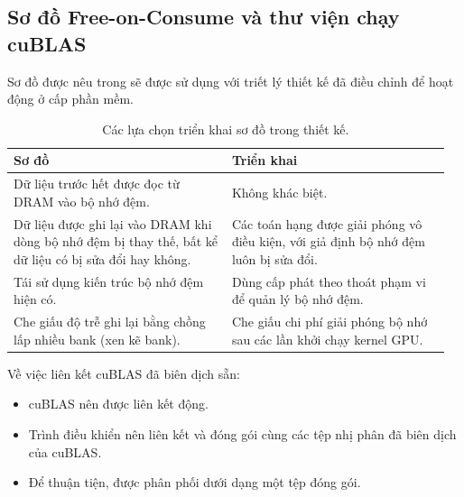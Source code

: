 \documentclass[a4paper]{article}
\begin{document}
	\subsection{Sơ đồ Free-on-Consume và thư viện chạy cuBLAS}
	Sơ đồ được nêu trong \cite{DybdahlKGN06} sẽ được sử dụng với triết lý thiết kế đã điều chỉnh để hoạt động ở cấp phần mềm.
	\begin{table}[htbp]
  \centering
  \caption{Các lựa chọn triển khai sơ đồ trong thiết kế.}
  \label{tab:scheme_implementation}
  \small
  \begin{tabular}{@{}>{\RaggedRight}p{0.48\linewidth} >{\RaggedRight}p{0.48\linewidth}@{}}
    \toprule
    \textbf{Sơ đồ} & \textbf{Triển khai} \\
    \midrule
    Dữ liệu trước hết được đọc từ DRAM vào bộ nhớ đệm. 
      & Không khác biệt. \\ \addlinespace
    
    Dữ liệu được ghi lại vào DRAM khi dòng bộ nhớ đệm bị thay thế, bất kể dữ liệu có bị sửa đổi hay không. 
      & Các toán hạng được giải phóng vô điều kiện, với giả định bộ nhớ đệm luôn bị sửa đổi. \\ \addlinespace
    
    Tái sử dụng kiến trúc bộ nhớ đệm hiện có. 
      & Dùng cấp phát theo thoát phạm vi để quản lý bộ nhớ đệm. \\ \addlinespace
    
    Che giấu độ trễ ghi lại bằng chồng lấp nhiều bank (xen kẽ bank). 
      & Che giấu chi phí giải phóng bộ nhớ sau các lần khởi chạy kernel GPU. \\
    \bottomrule
  \end{tabular}
\end{table}

	Về việc liên kết cuBLAS đã biên dịch sẵn:
	\begin{itemize}
		\item cuBLAS nên được liên kết động.
		\item Trình điều khiển nên liên kết và đóng gói cùng các tệp nhị phân đã biên dịch của cuBLAS.
		\item Để thuận tiện, được phân phối dưới dạng một tệp đóng gói.
	\end{itemize}

	
\end{document}
